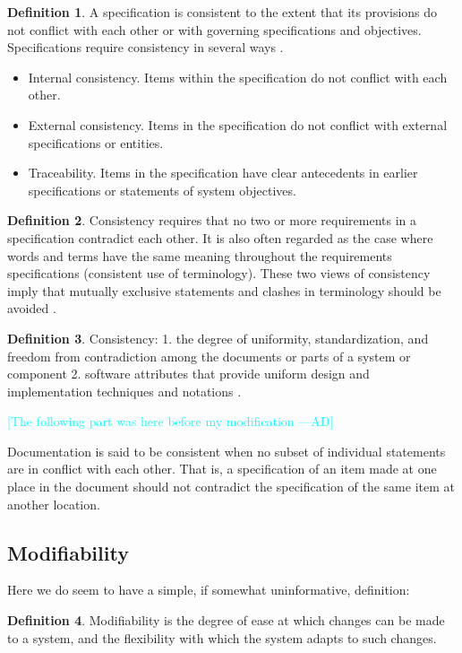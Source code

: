 \documentclass[letterpaper,cleveref]{lipics-v2019}
\newcommand{\authornote}[3]{\textcolor{#1}{[#3 ---#2]}}
\newcommand{\authornote}[3]{}
\newcommand{\ad}[1]{\authornote{cyan}{AD}{#1}} %
\theoremstyle{definition}
\newtheorem{defn}{Definition}
\begin{document}
\begin{defn}
A specification is consistent to the extent that its provisions do not conflict
with each other or with governing specifications and objectives. Specifications
require consistency in several ways \citep{Boehm1984}.
\begin{itemize}
\item Internal consistency. Items within the specification do not conflict with
each other.
\item External consistency. Items in the specification do not conflict with
external specifications or entities.
\item Traceability. Items in the specification have clear antecedents in earlier
specifications or statements of system objectives.
\end{itemize}
\end{defn}
\begin{defn}
Consistency requires that no two or more requirements in a specification
contradict each other. It is also often regarded as the case where words and
terms have the same meaning throughout the requirements specifications
(consistent use of terminology). These two views of consistency imply that
mutually exclusive statements and clashes in terminology should be avoided
\citep{ZOWGHI2003}.
\end{defn}
\begin{defn}
\label{ConsistencySelected}
Consistency: 1. the degree of uniformity, standardization, and freedom from
contradiction among the documents or parts of a system or component 2. software
attributes that provide uniform design and implementation techniques and
notations \citep{ISO/IEC/IEEE24765}.
\end{defn}

\ad{The following part was here before my modification}

Documentation is said to be consistent when no subset of individual statements
are in conflict with each other. That is, a specification of an item made at one
place in the document should not contradict the specification of the same item
at another location.

\subsection{Modifiability}

Here we do seem to have a simple, if somewhat uninformative, definition:

\begin{defn}
Modifiability is the degree of ease at which changes can be made to a system,
and the flexibility with which the system adapts to such changes.
\end{defn}
\end{document}
